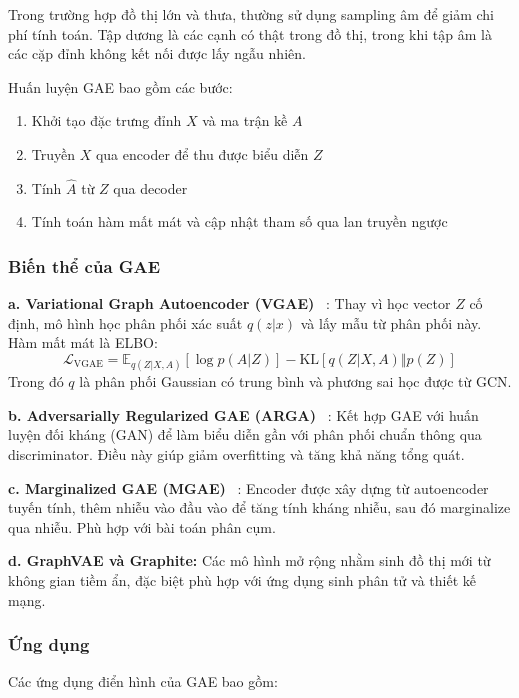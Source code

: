 \documentclass[a4paper]{article}
\begin{document}
Trong trường hợp đồ thị lớn và thưa, thường sử dụng sampling âm để giảm chi phí tính toán. Tập dương là các cạnh có thật trong đồ thị, trong khi tập âm là các cặp đỉnh không kết nối được lấy ngẫu nhiên.

Huấn luyện GAE bao gồm các bước:

\begin{enumerate}
  \item Khởi tạo đặc trưng đỉnh $X$ và ma trận kề $A$
  \item Truyền $X$ qua encoder để thu được biểu diễn $Z$
  \item Tính $\hat{A}$ từ $Z$ qua decoder
  \item Tính toán hàm mất mát và cập nhật tham số qua lan truyền ngược
\end{enumerate}

\subsubsection{Biến thể của GAE}

\textbf{a.  Variational Graph Autoencoder (VGAE)} ~\cite{kipf2016variational}:  
Thay vì học vector $Z$ cố định, mô hình học phân phối xác suất $q(z|x)$ và lấy mẫu từ phân phối này. Hàm mất mát là ELBO:
\begin{equation}
\mathcal{L}_{\text{VGAE}} = \mathbb{E}_{q(Z|X,A)}[\log p(A|Z)] - \text{KL}[q(Z|X,A) \Vert p(Z)]
\end{equation}
Trong đó $q$ là phân phối Gaussian có trung bình và phương sai học được từ GCN.

\textbf{b.  Adversarially Regularized GAE (ARGA)} ~\cite{pan2018arga}:  
Kết hợp GAE với huấn luyện đối kháng (GAN) để làm biểu diễn gần với phân phối chuẩn thông qua discriminator. Điều này giúp giảm overfitting và tăng khả năng tổng quát.

\textbf{c.  Marginalized GAE (MGAE)} ~\cite{wang2017mgae}:  
Encoder được xây dựng từ autoencoder tuyến tính, thêm nhiễu vào đầu vào để tăng tính kháng nhiễu, sau đó marginalize qua nhiễu. Phù hợp với bài toán phân cụm.

\textbf{d.  GraphVAE và Graphite:}  
Các mô hình mở rộng nhằm sinh đồ thị mới từ không gian tiềm ẩn, đặc biệt phù hợp với ứng dụng sinh phân tử và thiết kế mạng.

\subsubsection{Ứng dụng}

Các ứng dụng điển hình của GAE bao gồm:
\end{document}
